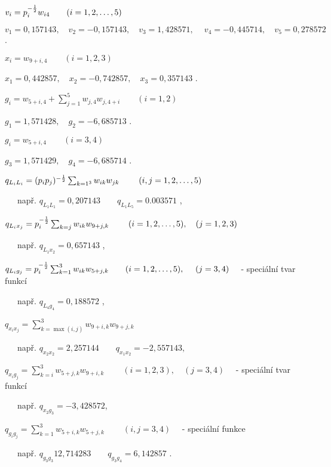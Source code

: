 %
$v_i = p_i^{-{1\over2}}w_{i4}\qquad(i=1,2,\ldots,5)$

\smallskip
 $v_1 = 0,157143, \quad v_2 =-0,157143, \quad v_3 = 1,428571,\
 \quad v_4 = -0,445714,\quad v_5 = 0,278572$ .

%
$x_i = w_{9+i,4} \qquad(i=1,2,3)$

\smallskip
        $x_1=0,442857,  \quad x_2=-0,742857, \quad x_3=0,357143$ .

%
$g_i = w_{5+i,4} + \sum_{j=1}^5 w_{j,4} w_{j,4+i} \qquad (i=1,2)$

\smallskip
 $g_1 = 1,571428, \quad g_2 = -6,685713$ .

%
$g_i = w_{5+i,4} \qquad (i=3,4)$

\smallskip
 $g_3 = 1,571429, \quad g_4 = -6,685714$ .


$q_{L_iL_i} = (p_ip_j)^{-{1\over2}} \sum_{k=1^3} w_{ik} w_{jk}\
\qquad (i,j=1,2,\ldots,5)$

\smallskip
~~~např. $q_{L_1L_1} = 0,207143 \qquad q_{L_1L_5} = 0.003571$ ,

$q_{L_ix_j} = p_i^{-{1\over2}}\sum_{k=j} w_{ik}w_{9+j,k}\
\qquad (i=1,2,\ldots,5), \quad (j=1,2,3)$

\smallskip
~~~např. $q_{L_1x_2} = 0,657143$ ,

\smallskip
$q_{L_ig_j}=p_i^{-{1\over2}}\sum_{k=1}^3 w_{ik}w_{5+j,k}\qquad(i=1,2,\ldots,5),\
\quad(j=3,4)\quad$ - speciální tvar funkcí

\smallskip
~~~např. $q_{L_4g_4} = 0,188572$ ,

\smallskip
$q_{x_ix_j} = \sum_{k=\max(i,j)}^3 w_{9+i,k} w_{9+j,k}$

\smallskip
~~~např. $q_{x_2x_2} = 2,257144 \qquad q_{x_1x_2} = - 2,557143,$

\smallskip
$q_{x_i g_j} = \sum_{k=i}^3 w_{5+j,k} w_{9+i,k} \qquad \
(i=1,2,3), \quad (j=3,4)\quad$ - speciální tvar funkcí

\smallskip
~~~např. $q_{x_2g_3} = -3,428572$,

\smallskip
$q_{g_ig_j} = \sum_{k=1}^3 w_{5+i,k} w_{5+j,k}\
\qquad (i,j=3,4)\quad$ - speciální funkce 

\smallskip
~~~např. $q_{g_3g_3} 12,714283 \qquad q_{g_3g_4} = 6,142857$ .
